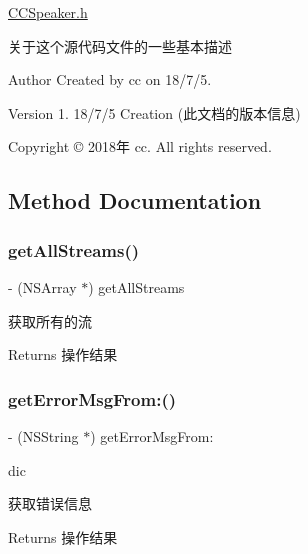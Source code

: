 \hyperlink{_c_c_speaker_8h_source}{C\+C\+Speaker.\+h}

关于这个源代码文件的一些基本描述

\begin{DoxyAuthor}{Author}
Created by cc on 18/7/5.
\end{DoxyAuthor}
\begin{DoxyVersion}{Version}
1. 18/7/5 Creation (此文档的版本信息)
\end{DoxyVersion}
Copyright © 2018年 cc. All rights reserved. 

\subsection{Method Documentation}
\mbox{\label{interface_c_c_speaker_a1cd2a8633022985f13382a6895f96f21}} 
\subsubsection{\texorpdfstring{get\+All\+Streams()}{getAllStreams()}}
{\footnotesize\ttfamily -\/ (N\+S\+Array $\ast$) get\+All\+Streams \begin{DoxyParamCaption}{ }\end{DoxyParamCaption}}

获取所有的流 \begin{DoxyReturn}{Returns}
操作结果 
\end{DoxyReturn}
\mbox{\label{interface_c_c_speaker_a89a3d868010262874a4bb26e349655fb}} 
\subsubsection{\texorpdfstring{get\+Error\+Msg\+From\+:()}{getErrorMsgFrom:()}}
{\footnotesize\ttfamily -\/ (N\+S\+String $\ast$) get\+Error\+Msg\+From\+: \begin{DoxyParamCaption}\item[{(N\+S\+Dictionary $\ast$)}]{dic }\end{DoxyParamCaption}}

获取错误信息 \begin{DoxyReturn}{Returns}
操作结果 
\end{DoxyReturn}
\mbox{\label{interface_c_c_speaker_abae7fec416e47da8468342b66a587da9}} 
